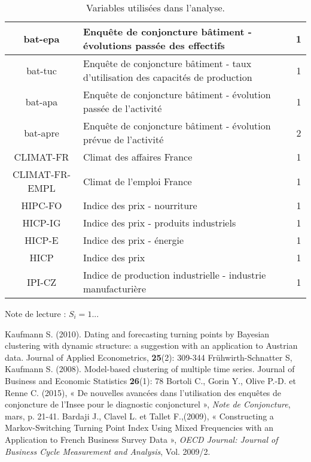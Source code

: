 \documentclass[10pt,french,french]{article}
\begin{document}
\begin{table}[h]
{\begin{tabular}{ | c | l | c|}
     bat-epa & Enquête de conjoncture bâtiment - évolutions passée des effectifs & 1\\ \hline
     bat-tuc & Enquête de conjoncture bâtiment - taux d'utilisation des capacités de production & 1\\ \hline
     bat-apa & Enquête de conjoncture bâtiment - évolution passée de l'activité & 1 \\ \hline
     bat-apre & Enquête de conjoncture bâtiment -  évolution prévue de l'activité & 2\\ \hline
     CLIMAT-FR & Climat des affaires France & 1 \\ \hline
     CLIMAT-FR-EMPL & Climat de l'emploi France  & 1 \\ \hline
     HIPC-FO & Indice des prix - nourriture & 1 \\ \hline
     HICP-IG & Indice des prix - produits industriels & 1 \\ \hline
     HICP-E & Indice des prix - énergie & 1 \\ \hline
     HICP & Indice des prix & 1 \\ \hline
     IPI-CZ & Indice de production industrielle - industrie manufacturière & 1 \\
     \hline
   \end{tabular}
   \caption{Variables utilisées dans l'analyse.}\label{tableau_var}}
  \footnotesize
Note de lecture : $S_i=1$...
\end{table}

\newpage

\nocite{*}

\begin{thebibliography}{999}
 Kaufmann S. (2010). Dating and forecasting turning points by Bayesian clustering with dynamic structure: a suggestion with an application to Austrian data. Journal of Applied Econometrics, \textbf{25}(2): 309-344 
 Frühwirth-Schnatter S, Kaufmann S. (2008). Model-based clustering of multiple time series. Journal of Business and Economic Statistics \textbf{26}(1): 78
 Bortoli C., Gorin Y., Olive P.-D. et Renne C. (2015), « De nouvelles avancées dans l’utilisation des enquêtes de conjoncture de l’Insee pour le diagnostic conjoncturel », \emph{Note de Conjoncture}, mars, p. 21-41.
 Bardaji J., Clavel L. et Tallet F.,(2009), « Constructing a Markov-Switching Turning Point Index Using Mixed Frequencies with an Application to French Business Survey Data », \emph{OECD Journal: Journal of Business Cycle Measurement and Analysis}, Vol. 2009/2.
\end{thebibliography}
\end{document}

